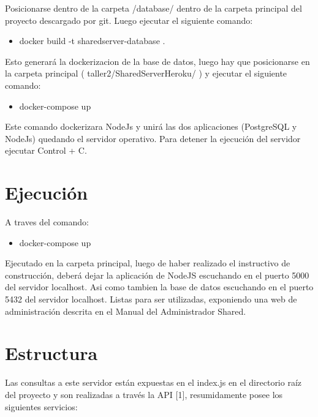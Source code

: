 \documentclass[a4paper,10pt,spanish]{sphinxmanual}
\begin{document}
Posicionarse dentro de la carpeta /database/ dentro de la carpeta principal del proyecto descargado por git. Luego ejecutar el siguiente comando:
\begin{itemize}
\item {} 
docker build -t sharedserver-database .

\end{itemize}

Esto generará la dockerizacion de la base de datos, luego hay que posicionarse en la carpeta principal ( taller2/SharedServerHeroku/ ) y ejecutar el siguiente comando:
\begin{itemize}
\item {} 
docker-compose up

\end{itemize}

Este comando dockerizara NodeJs y unirá las dos aplicaciones (PostgreSQL y NodeJs) quedando el servidor operativo. Para detener la ejecución del servidor ejecutar Control + C.


\section{Ejecución}
\label{sharedServer:ejecucion}
A traves del comando:
\begin{itemize}
\item {} 
docker-compose up

\end{itemize}

Ejecutado en la carpeta principal, luego de haber realizado el instructivo de construcción, deberá dejar la aplicación de NodeJS escuchando en el puerto 5000 del servidor localhost. Asi como tambien la base de datos escuchando en el puerto 5432 del servidor localhost. Listas para ser utilizadas, exponiendo una web de administración descrita en el Manual del Administrador Shared.


\section{Estructura}
\label{sharedServer:estructura}
Las consultas a este servidor están expuestas en el index.js en el directorio raíz del proyecto y son realizadas a través la API {[}1{]}, resumidamente posee los siguientes servicios:
\end{document}
